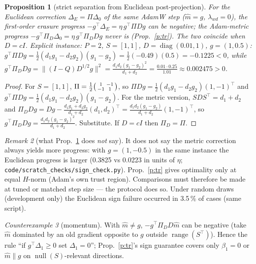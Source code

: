 \documentclass[11pt]{article}
\newtheorem{proposition}{Proposition}
\theoremstyle{remark}
\newtheorem{remark}[proposition]{Remark}
\newtheorem{counterexample}[proposition]{Counterexample}
\begin{document}
\begin{proposition}[strict separation from Euclidean post-projection]\label{p:sep}
For the Euclidean correction $\Delta_E=\Pi\Delta_0$ of the same AdamW step ($\hat m=g$, $\lambda_{wd}=0$), the first-order
erasure progress $-g^\top\Delta_E=\eta\,g^\top\Pi Dg$ \emph{can be negative}; the Adam-metric progress
$-g^\top\Pi_D\Delta_0=\eta\,g^\top\Pi_DDg$ never is (Prop.~\ref{p:tr}). The two coincide when $D=cI$.
Explicit instance: $P=2$, $S=[1,1]$, $D=\operatorname{diag}(0.01,1)$, $g=(1,0.5)$:
$g^\top\Pi Dg=\tfrac12(d_1g_1-d_2g_2)(g_1-g_2)=\tfrac12(-0.49)(0.5)=-0.1225<0$, while
$g^\top\Pi_DDg=\|(I-Q)D^{1/2}g\|^2=\frac{d_1d_2(g_1-g_2)^2}{d_1+d_2}=\frac{0.01\cdot0.25}{1.01}\approx0.002475>0$.
\end{proposition}
\begin{proof}
For $S=[1,1]$, $\Pi=\frac12\begin{psmallmatrix}1&-1\\-1&1\end{psmallmatrix}$, so $\Pi Dg=\frac12(d_1g_1-d_2g_2)(1,-1)^\top$ and
$g^\top\Pi Dg=\frac12(d_1g_1-d_2g_2)(g_1-g_2)$. For the metric version, $SDS^\top=d_1+d_2$ and
$\Pi_DDg=Dg-\frac{d_1g_1+d_2g_2}{d_1+d_2}(d_1,d_2)^\top=\frac{d_1d_2(g_1-g_2)}{d_1+d_2}(1,-1)^\top$, so
$g^\top\Pi_DDg=\frac{d_1d_2(g_1-g_2)^2}{d_1+d_2}$. Substitute. If $D=cI$ then $\Pi_D=\Pi$.
\end{proof}
\begin{remark}[what Prop.~\ref{p:sep} does \emph{not} say] It does not say the metric correction always yields more
progress: with $g=(1,-0.5)$ in the same instance the Euclidean progress is larger (0.3825 vs 0.0223 in units of $\eta$;
\texttt{code/scratch\_checks/sign\_check.py}). Prop.~\ref{p:tr} gives optimality only at equal $H$-norm (Adam's own trust
region). Comparisons must therefore be made at tuned or matched step size --- the protocol does so.
Under random draws (development only) the Euclidean sign failure occurred in 3.5\,\% of cases (same script).\end{remark}

\begin{counterexample}[momentum]\label{c:mom}
With $\hat m\ne g$, $-g^\top\Pi_D D\hat m$ can be negative (take $\hat m$ dominated by an old gradient opposite to $g$
outside $\operatorname{range}(S^\top)$). Hence the rule ``if $g^\top\Delta_1\ge0$ set $\Delta_1=0$''; Prop.~\ref{p:tr}'s
sign guarantee covers only $\beta_1=0$ or $\hat m\parallel g$ on $\operatorname{null}(S)$-relevant directions.
\end{counterexample}
\end{document}
